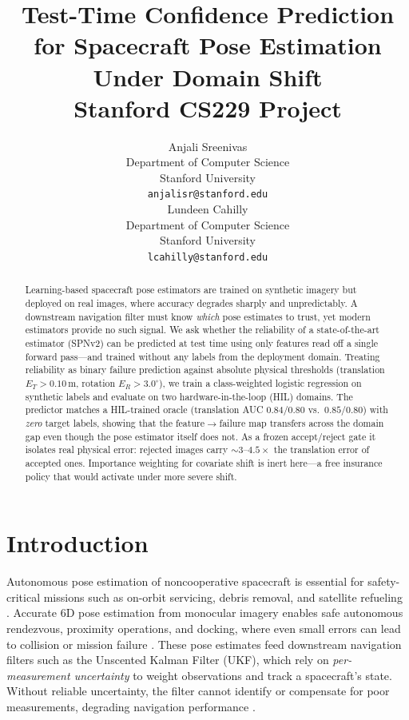 \documentclass{article}
\title{
  \textbf{Test-Time Confidence Prediction for Spacecraft Pose
Estimation Under Domain Shift} \\
  \vspace{1em}
  \small{\normalfont Stanford CS229 Project}
}
\author{
  Anjali Sreenivas \\
  Department of Computer Science \\
  Stanford University \\
  \texttt{anjalisr@stanford.edu} \\
  \And
  Lundeen Cahilly \\
  Department of Computer Science \\
  Stanford University \\
  \texttt{lcahilly@stanford.edu} \\
}
\newcommand{\ET}{E_T}
\newcommand{\ER}{E_R}
\begin{document}
\maketitle

\begin{abstract}
Learning-based spacecraft pose estimators are trained on synthetic imagery but
deployed on real images, where accuracy degrades sharply and unpredictably. A
downstream navigation filter must know \emph{which} pose estimates to trust, yet
modern estimators provide no such signal. We ask whether the reliability of a
state-of-the-art estimator (SPNv2) can be predicted at test time using only
features read off a single forward pass---and trained without any labels from the
deployment domain. Treating reliability as binary failure prediction against
absolute physical thresholds (translation $\ET>0.10$\,m, rotation $\ER>3.0^\circ$),
we train a class-weighted logistic regression on synthetic labels and evaluate on
two hardware-in-the-loop (HIL) domains. The predictor matches a HIL-trained oracle
(translation AUC $0.84$/$0.80$ vs.\ $0.85$/$0.80$) with \emph{zero} target labels,
showing that the feature$\rightarrow$failure map transfers across the domain gap
even though the pose estimator itself does not. As a frozen accept/reject gate it
isolates real physical error: rejected images carry $\sim$3--$4.5\times$ the
translation error of accepted ones. Importance weighting for covariate shift is
inert here---a free insurance policy that would activate under more severe shift.
\end{abstract}

\section{Introduction}

Autonomous pose estimation of noncooperative spacecraft is essential for
safety-critical missions such as on-orbit servicing, debris removal, and satellite
refueling \citep{pauly_survey_2023}. Accurate 6D pose estimation from monocular
imagery enables safe autonomous rendezvous, proximity operations, and docking,
where even small errors can lead to collision or mission failure
\citep{park_speed_2022, pasqualetto_cassinis_review_2019}. These pose estimates feed
downstream navigation filters such as the Unscented Kalman Filter (UKF), which rely
on \emph{per-measurement uncertainty} to weight observations and track a
spacecraft's state. Without reliable uncertainty, the filter cannot identify or
compensate for poor measurements, degrading navigation performance
\citep{park_robust_2024}.
\end{document}
